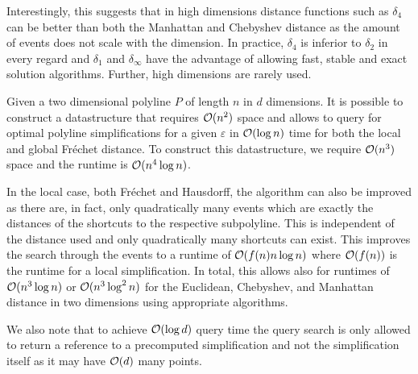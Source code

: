 Interestingly, this suggests that in high dimensions distance functions such as \(\delta_4\) can be better than both the Manhattan and Chebyshev distance as the amount of events does not scale with the dimension. In practice, \(\delta_4\) is inferior to \(\delta_2\) in every regard and \(\delta_1\) and \(\delta_\infty\) have the advantage of allowing fast, stable and exact solution algorithms. Further, high dimensions are rarely used.

\begin{corollary}
	Given a two dimensional polyline \(P\) of length \(n\) in \(d\) dimensions. It is possible to construct a datastructure that requires \(\mathcal{O}(n^2)\) space and allows to query for optimal polyline simplifications for a given \(\varepsilon\) in \(\mathcal{O}(\log n)\) time for both the local and global Fréchet distance. To construct this datastructure, we require \(\mathcal{O}(n^3)\) space and the runtime is \(\mathcal{O}(n^4 \log n)\).
\end{corollary}

In the local case, both Fréchet and Hausdorff, the algorithm can also be improved as there are, in fact, only quadratically many events which are exactly the distances of the shortcuts to the respective subpolyline. This is independent of the distance used and only quadratically many shortcuts can exist. This improves the search through the events to a runtime of \(\mathcal{O}(f(n)n\log n)\) where \(\mathcal{O}(f(n))\) is the runtime for a local simplification. In total, this allows also for runtimes of \(\mathcal{O}(n^3\log n)\) or \(\mathcal{O}(n^3\log^2 n)\) for the Euclidean, Chebyshev, and Manhattan distance in two dimensions using appropriate algorithms.


We also note that to achieve \(\mathcal{O}(\log d)\) query time the query search is only allowed to return a reference to a precomputed simplification and not the simplification itself as it may have \(\mathcal{O}(d)\) many points. 

